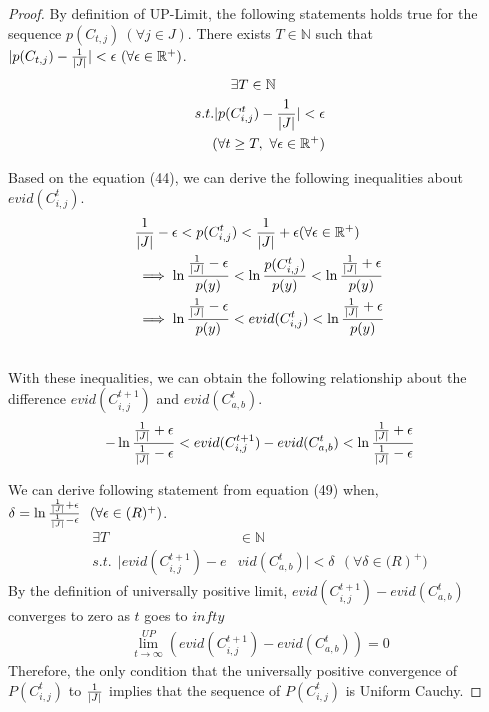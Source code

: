 \begin{proof}
By definition of UP-Limit, the following statements holds true for the sequence $p(C_{t,j})\ (\forall j \in J)$.
There exists $T \in \mathbb{N}$ 
such that $|p(C_{t,j})-{1 \over |J|}| < \epsilon\ (\forall \epsilon \in \mathbb{R}^+)$.
\begin{align}
    \begin{split}
        &\exists T \in \mathbb{N}\\
        s.t. |p(&C^t_{i,j})-{1 \over |J|}| < \epsilon \\
        (\forall t &\geq T,\ \forall \epsilon \in \mathbb{R}^+) 
    \end{split}
\end{align}

Based on the equation (44), we can derive the following inequalities about $evid(C^t_{i,j})$. 
\begin{align}
           &{1 \over |J|} - \epsilon < p(C^t_{i,j})  <  {1 \over |J|} +\epsilon (\forall \epsilon \in \mathbb{R}^+)\\
&\implies   \ln{{1 \over |J|} - \epsilon \over p(y)} < \ln{p(C^t_{i,j})\over p(y)} < \ln{{1 \over |J|} + \epsilon \over p(y)}\\
&\implies   \ln{{1 \over |J|} - \epsilon \over p(y)} < evid(C^t_{i,j}) < \ln{{1 \over |J|} + \epsilon \over p(y)}\\
&
\end{align}
With these inequalities, we can obtain the following relationship about the difference $evid(C^{t+1}_{i,j})$ and $evid(C^t_{a,b})$.
\begin{align}
    -\ln{{1\over|J|} + \epsilon \over {1 \over |J|} - \epsilon} < evid(C^{t+1}_{i,j}) - evid(C^t_{a,b}) 
    < \ln{{1\over|J|}+\epsilon \over {1 \over |J|} -\epsilon}
\end{align}

We can derive following statement from equation (49) when, 
$\delta = \ln{{1 \over |J|}+\epsilon \over {1 \over |J|} -\epsilon} \ \  (\forall \epsilon \in \mathbb(R)^{+})$. 
\begin{align}
    \exists T &\in \mathbb{N}\\
    s.t.\ \ |evid(C^{t+1}_{i,j})-e&vid(C^t_{a,b})| < \delta \ \ (\forall \delta \in \mathbb(R)^+)
\end{align}
By the definition of universally positive limit, $evid(C^{t+1}_{i,j})-evid(C^{t}_{a,b})$ converges to zero as $t$ goes to $infty$
\begin{align}
    \lim_{t\rightarrow \infty}^{UP}(evid(C^{t+1}_{i,j})-evid(C^{t}_{a,b}))=0
\end{align}
Therefore, the only condition that the universally positive convergence of $P(C^t_{i,j})$ to ${1 \over |J|}$
implies that the sequence of $P(C^t_{i,j})$ is Uniform Cauchy.
\end{proof}

